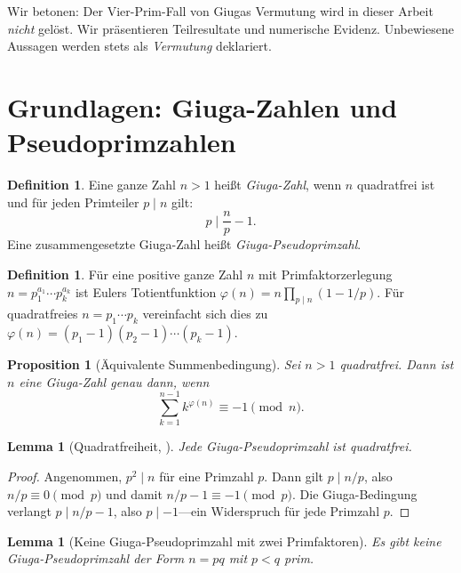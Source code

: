 \documentclass[12pt,a4paper]{amsart}
\newtheorem{lemma}[theorem]{Lemma}
\newtheorem{proposition}[theorem]{Proposition}
\theoremstyle{definition}
\newtheorem{definition}[theorem]{Definition}
\begin{document}
Wir betonen: Der Vier-Prim-Fall von Giugas Vermutung wird in dieser Arbeit
\emph{nicht} gelöst.  Wir präsentieren Teilresultate und numerische Evidenz.
Unbewiesene Aussagen werden stets als \emph{Vermutung} deklariert.

\section{Grundlagen: Giuga-Zahlen und Pseudoprimzahlen}
\label{sec:grundlagen}

\begin{definition}
\label{def:giuga}
Eine ganze Zahl $n > 1$ heißt \emph{Giuga-Zahl}, wenn $n$ quadratfrei ist
und für jeden Primteiler $p \mid n$ gilt:
\[
  p \mid \frac{n}{p} - 1.
\]
Eine zusammengesetzte Giuga-Zahl heißt \emph{Giuga-Pseudoprimzahl}.
\end{definition}

\begin{definition}
\label{def:euler}
Für eine positive ganze Zahl $n$ mit Primfaktorzerlegung $n = p_1^{a_1} \cdots
p_k^{a_k}$ ist Eulers Totientfunktion $\varphi(n) = n \prod_{p \mid n}(1 - 1/p)$.
Für quadratfreies $n = p_1 \cdots p_k$ vereinfacht sich dies zu
$\varphi(n) = (p_1 - 1)(p_2 - 1) \cdots (p_k - 1)$.
\end{definition}

\begin{proposition}[Äquivalente Summenbedingung]
\label{prop:summe}
Sei $n > 1$ quadratfrei.  Dann ist $n$ eine Giuga-Zahl genau dann, wenn
\[
  \sum_{k=1}^{n-1} k^{\varphi(n)} \equiv -1 \pmod{n}.
\]
\end{proposition}

\begin{lemma}[Quadratfreiheit, {\cite{Giuga1950, Borwein1996}}]
\label{lem:quadratfrei}
Jede Giuga-Pseudoprimzahl ist quadratfrei.
\end{lemma}

\begin{proof}
Angenommen, $p^2 \mid n$ für eine Primzahl $p$.  Dann gilt $p \mid n/p$,
also $n/p \equiv 0 \pmod{p}$ und damit $n/p - 1 \equiv -1 \pmod{p}$.
Die Giuga-Bedingung verlangt $p \mid n/p - 1$, also $p \mid {-1}$---ein
Widerspruch für jede Primzahl $p$.
\end{proof}

\begin{lemma}[Keine Giuga-Pseudoprimzahl mit zwei Primfaktoren]
\label{lem:zweiprim}
Es gibt keine Giuga-Pseudoprimzahl der Form $n = pq$ mit $p < q$ prim.
\end{lemma}
\end{document}

